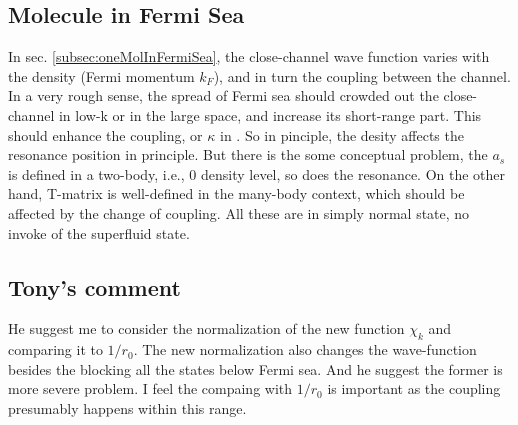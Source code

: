 \subsection{Molecule in Fermi Sea}
In sec. \ref{subsec:oneMolInFermiSea}, the close-channel wave function varies with the density (Fermi momentum $k_F$), and in turn the coupling between the channel.  In a very rough sense, the spread of Fermi sea should crowded out the close-channel in low-k or in the large space, and increase its short-range part.  This should enhance the coupling, or $\kappa$ in \cite{Leggett}.  So in pinciple, the desity affects the resonance position in principle.  But there is the some conceptual problem, the $a_s$ is defined in a two-body, i.e., 0 density level, so does the resonance.  On the other hand, T-matrix is well-defined in the many-body context, which should be affected by the change of coupling. All these are in simply normal state, no invoke of the superfluid state.  

\subsection{Tony's comment}
He suggest me to consider the normalization of the new function $\chi_k$ and comparing it to $1/r_0$.  The new normalization also changes the wave-function besides the blocking all the states below Fermi sea.  And he suggest the former is more severe problem.   I feel the compaing with $1/r_0$ is important as the coupling presumably happens within this range.  